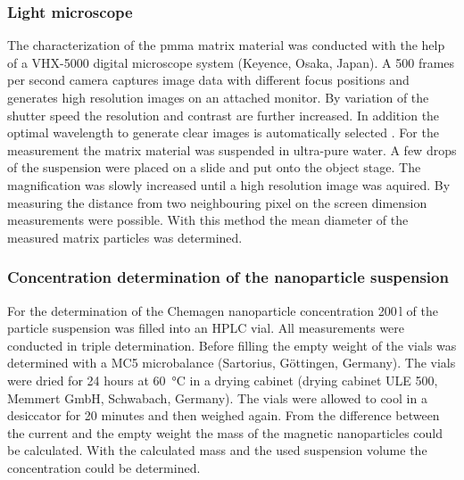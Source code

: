 \subsubsection{Light microscope}
\label{subsubsec:light_mic}
The characterization of the \gls{pmma} matrix material was conducted with the help of a VHX-5000 digital microscope system (Keyence, Osaka, Japan). A 500 frames per second camera captures image data with different focus positions and generates high resolution images on an attached monitor. By variation of the shutter speed the resolution and contrast are further increased. In addition the optimal wavelength to generate clear images is automatically selected \cite{VHX5000}. For the measurement the matrix material was suspended in ultra-pure water. A few drops of the suspension were placed on a slide and put onto the object stage. The magnification was slowly increased until a high resolution image was aquired. By measuring the distance from two neighbouring pixel on the screen dimension measurements were possible. With this method the mean diameter of the measured matrix particles was determined.    


\subsubsection{Concentration determination of the nanoparticle suspension}
\label{subsubsec:Conc_MF}
For the determination of the Chemagen nanoparticle concentration 200\,\textmu l of the particle suspension was filled into an HPLC vial. All measurements were conducted in triple determination. Before filling the empty weight of the vials was determined with a MC5 microbalance (Sartorius, Göttingen, Germany). The vials were dried for 24 hours at \SI{60}{\celsius} in a drying cabinet (drying cabinet ULE 500, Memmert GmbH, Schwabach, Germany). The vials were allowed to cool in a desiccator for 20 minutes and then weighed again. From the difference between the current and the empty weight the mass of the magnetic nanoparticles could be calculated. With the calculated mass and the used suspension volume the concentration could be determined.  


